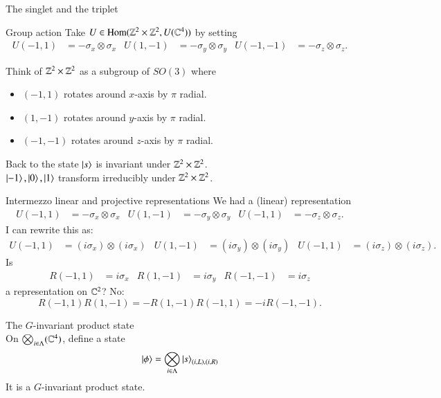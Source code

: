 \documentclass{beamer}
\begin{document}
\begin{frame}{The singlet and the triplet}
	\begin{block}{Group action}
		Take $U\in \textrm{Hom}(\mathbb{Z}^2\times \mathbb{Z}^2,U(\mathbb{C}^4))$ by setting
		\begin{align*}
		U(-1,1)&=-\sigma_x\otimes \sigma_x&U(1,-1)&=-\sigma_y\otimes \sigma_y&U(-1,-1)&=-\sigma_z\otimes \sigma_z.
		\end{align*}
	\end{block}
	Think of $\mathbb{Z}^2\times \mathbb{Z}^2$ as a subgroup of $SO(3)$ where
	\begin{itemize}
		\item $(-1,1)$ rotates around $x$-axis by $\pi$ radial.
		\item $(1,-1)$ rotates around $y$-axis by $\pi$ radial.
		\item $(-1,-1)$ rotates around $z$-axis by $\pi$ radial.
	\end{itemize}
	\pause
	\begin{block}{Back to the state}
		$\ket{s}$ is invariant under $\mathbb{Z}^2\times \mathbb{Z}^2$.\\
		$\ket{-1},\ket{0},\ket{1}$ transform irreducibly under $\mathbb{Z}^2\times \mathbb{Z}^2$.
	\end{block}
\end{frame}

\begin{frame}{Intermezzo linear and projective representations}
	We had a (linear) representation
	\begin{align*}
			U(-1,1)&=-\sigma_x\otimes \sigma_x&U(1,-1)&=-\sigma_y\otimes \sigma_y&U(-1,1)&=-\sigma_z\otimes \sigma_z.
	\end{align*}
	\pause
	I can rewrite this as:\\
	\begin{align*}
	U(-1,1)&=(i\sigma_x)\otimes (i\sigma_x)&U(1,-1)&=(i\sigma_y)\otimes (i\sigma_y)&U(-1,1)&=(i\sigma_z)\otimes (i\sigma_z).
	\end{align*}
	\pause
	Is
	\begin{align*}
		R(-1,1)&=i\sigma_x&R(1,-1)&=i\sigma_y&R(-1,-1)&=i\sigma_z
	\end{align*}
	 a representation on $\mathbb{C}^2$? \pause No:
	\begin{equation*}
		R(-1,1)R(1,-1)=-R(1,-1)R(-1,1)=-i R(-1,-1).
	\end{equation*}
\end{frame}

\begin{frame}{The $G$-invariant product state}
	\\
	On $\bigotimes_{i\in\Lambda}(\mathbb{C}^4)$, define a state
	\begin{equation*}
		\ket{\phi}=\bigotimes_{i\in\Lambda}\ket{s}_{(i,L),(i,R)}
	\end{equation*}
	\pause
	It is a $G$-invariant product state.
\end{frame}
\end{document}
